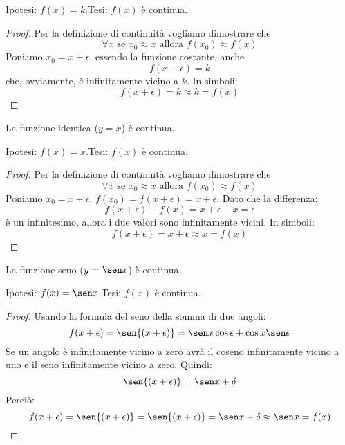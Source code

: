 \noindent Ipotesi: \(f(x)=k\).\tab Tesi: \(f(x)\) è continua.

\begin{proof}
Per la definizione di continuità vogliamo dimostrare che 
\[\forall x \text{ se } x_0 \approx x \text{ allora } f(x_0) \approx f(x)\]
Poniamo \(x_0=x+\epsilon\), essendo la funzione costante, anche 
\[f(x+\epsilon)=k\] 
che, ovviamente, è infinitamente vicino a \(k\). In simboli:
\[f(x+\epsilon) = k \approx k = f(x)\] 
\end{proof}

\begin{teorema}
La funzione identica (\(y=x\)) è continua.
\end{teorema}

\noindent Ipotesi: \(f(x)=x\).\tab Tesi: \(f(x)\) è continua.

\begin{proof}
Per la definizione di continuità vogliamo dimostrare che 
\[\forall x \text{ se } x_0 \approx x \text{ allora } f(x_0) \approx f(x)\]
Poniamo \(x_0=x+\epsilon\), \(f(x_0) = f(x+\epsilon)=x+\epsilon\). 
Dato che la differenza:
\[f(x+\epsilon)-f(x) = x+\epsilon-x= \epsilon\]
è un infinitesimo, allora i due valori sono infinitamente vicini. In simboli:
\[f(x+\epsilon) = x+\epsilon \approx x = f(x)\] 
\end{proof}

\begin{teorema}
La funzione seno (\(y=\sen x\)) è continua.
\end{teorema}

\noindent Ipotesi: \(f(x)=\sen x\).\tab Tesi: \(f(x)\) è continua.

\begin{proof}
Usando la formula del seno della somma di due angoli:
\[f(x+\epsilon) =
\sen{(x+\epsilon)} = \sen x \cos \epsilon + \cos x \sen \epsilon\]
Se un angolo è infinitamente vicino a zero avrà il coseno infinitamente vicino 
a uno e il seno infinitamente vicino a zero. Quindi:
\[\sen{(x+\epsilon)} = \sen x + \delta\]
Perciò:
\[f(x+\epsilon) =
\sen{(x+\epsilon)} = \sen{(x+\epsilon)} = 
\sen x + \delta \approx \sen x = f(x)\]
\end{proof}
% 
% 
% 

